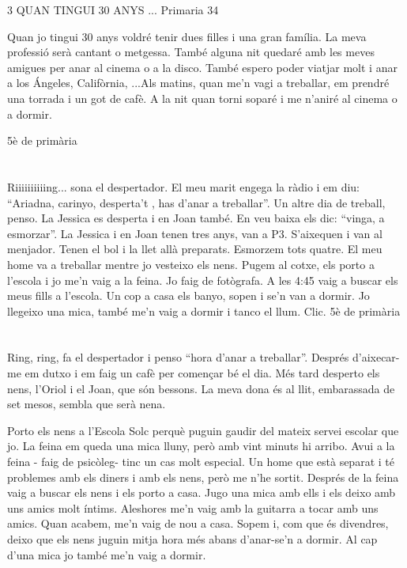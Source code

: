 %
%
\begin{news}
{3} %
{QUAN TINGUI 30 ANYS ...}
{}
{Primaria}
{34}

Quan jo tingui 30 anys voldré tenir dues filles i una gran família. La meva professió serà cantant o metgessa. També alguna nit quedaré amb les meves amigues per anar al cinema o a la disco. També espero poder viatjar molt  i anar a los Ángeles, Califòrnia, ...Als matins, quan me’n vagi a treballar,  em prendré una torrada i un got de cafè. A la nit quan torni soparé i me n’aniré al cinema o a dormir.

							{5è de primària}

\section*{}
Riiiiiiiiiing... sona el despertador. El meu marit engega la ràdio i em diu: “Ariadna, carinyo, desperta’t ,  has d’anar a treballar”. Un altre dia de treball, penso. La Jessica es desperta i en Joan també. En veu baixa els dic: “vinga, a esmorzar”. La Jessica i en Joan tenen tres anys, van a P3. S’aixequen i van al menjador. Tenen el bol i la llet allà preparats. Esmorzem tots quatre. El meu home va a treballar mentre jo vesteixo els nens. Pugem al cotxe, els porto a l’escola i jo me’n vaig a la feina. Jo faig de fotògrafa. A les 4:45 vaig a buscar els  meus fills a l’escola. Un cop a casa els banyo, sopen i se’n van a dormir. Jo llegeixo una mica, també me’n vaig a dormir i tanco el llum. Clic.
							 {5è de primària}

\section*{}
Ring, ring, fa el despertador i penso “hora d’anar a treballar”. Després d’aixecar-me em dutxo i em faig un cafè per començar bé el dia. Més tard desperto els nens, l’Oriol i el Joan, que són bessons. La meva dona és al llit, embarassada de set mesos, sembla que serà nena.

Porto els nens a l’Escola Solc perquè puguin gaudir del mateix servei escolar que jo. La feina em queda una mica lluny, però amb vint minuts hi arribo. Avui a la feina - faig de psicòleg-  tinc un cas molt especial. Un home que està separat i té problemes amb els diners i amb els nens, però me n’he sortit. Després de la feina vaig a buscar els nens i els porto a casa. Jugo una mica amb ells i els deixo amb uns amics molt íntims. Aleshores me’n vaig amb la guitarra  a tocar amb uns amics. Quan acabem, me’n vaig de nou a casa. Sopem i,  com que és divendres,  deixo que els nens juguin mitja hora més abans d’anar-se’n a dormir. Al cap d’una mica jo també me’n vaig a dormir.


\end{news}
